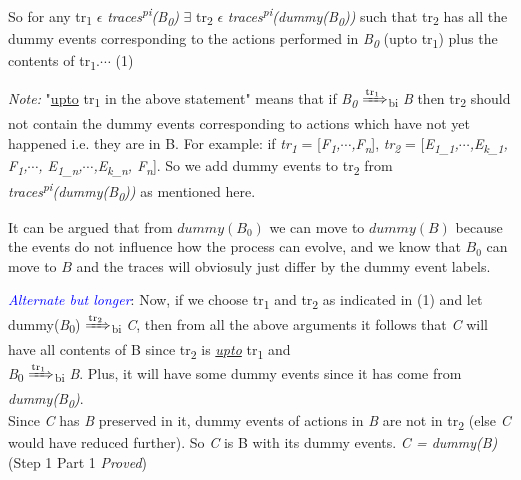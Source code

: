 \documentclass[11pt]{article}
\begin{document}
So for any tr\textsubscript{1} $\epsilon$ {\it traces\textsuperscript{pi}(B\textsubscript{0})} $\exists$ tr\textsubscript{2} $\epsilon$ {\it traces\textsuperscript{pi}(dummy(B\textsubscript{0}))} such that tr\textsubscript{2} has all the dummy events corresponding to the actions performed in {\it B\textsubscript{0}} (upto tr\textsubscript{1}) plus the contents of tr\textsubscript{1}.\hfill \hfill  $\cdots$ (1)\newline

{\it Note:} "\underline{upto} tr\textsubscript{1} in the above statement" means that if  {\it B\textsubscript{0}} {$\xRightarrow[\text{}]{\text{tr\textsubscript{1}}}$}\textsubscript{bi} {\it B} then tr\textsubscript{2} should not contain the dummy events corresponding to actions which have not yet happened i.e. they are in B. For example: if {\it tr\textsubscript{1}} = [{\it F\textsubscript{1},$\cdots$,F\textsubscript{n}}], {\it tr\textsubscript{2}} = [{\it E\textsubscript{1\_1},$\cdots$,E\textsubscript{k\_1}, F\textsubscript{1},$\cdots$, E\textsubscript{1\_n},$\cdots$,E\textsubscript{k\_n}, F\textsubscript{n}}]. So we add dummy events to tr\textsubscript{2} from {\it traces\textsuperscript{pi}(dummy(B\textsubscript{0}))} as mentioned here. \newline

It can be argued that from $dummy(B_0)$ we can move to $dummy(B)$ because the events do not influence how the process can evolve, and we know that $B_0$ can move to $B$ and the traces will obviosuly just differ by the dummy event labels.\newline

\textcolor{blue}{{\it Alternate but longer}}: Now, if we choose tr\textsubscript{1} and tr\textsubscript{2} as indicated in (1) and let dummy({\it B}\textsubscript{0}) {$\xRightarrow[\text{}]{\text{tr\textsubscript{2}}}$}\textsubscript{bi} {\it C}, then from all the above arguments it follows that {\it C} will have all contents of B since tr\textsubscript{2} is \underline{{\it upto}} tr\textsubscript{1} and \\{\it B}\textsubscript{0} {$\xRightarrow[\text{}]{\text{tr\textsubscript{1}}}$}\textsubscript{bi} {\it B}. Plus, it will have some dummy events since it has come from {\it dummy(B\textsubscript{0})}. \\Since {\it C} has {\it B} preserved in it, dummy events of actions in {\it B} are not in tr\textsubscript{2} (else {\it C} would have reduced further). So {\it C} is B with its dummy events. {\it C = dummy(B)} \hfill \hfill (Step 1 Part 1 {\it Proved})  \newline
\end{document}
